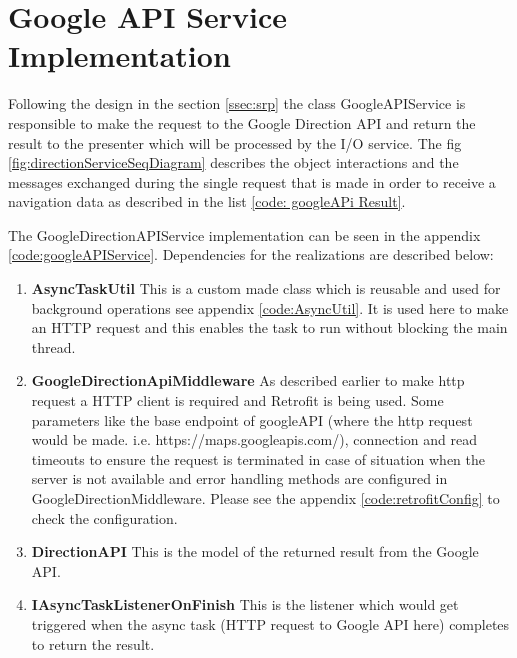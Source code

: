 \newpage
\section{Google API Service Implementation}
    Following the design in the section \ref{ssec:srp} the class 
    GoogleAPIService is responsible to make the request to the Google
    Direction API and return the result to the presenter which will be
    processed by the I/O service. The fig \ref{fig:directionServiceSeqDiagram}
    describes the object interactions and the messages exchanged during the
    single request that is made in order to receive a navigation data as described in
    the list \ref{code: googleAPi Result}.
    
    \par
        The GoogleDirectionAPIService implementation can be seen in
        the appendix \ref{code:googleAPIService}.
        Dependencies for the realizations are described below:
        \begin{enumerate}
            \item  
                \textbf{AsyncTaskUtil}
                    This is a custom made class which is reusable and used for background
                    operations see appendix \ref{code:AsyncUtil}. It is used here to make an HTTP request and this enables
                    the task to run without blocking the main thread. 
            \item  
                \textbf{GoogleDirectionApiMiddleware}
                As described earlier to make http request a HTTP client 
                is required and Retrofit
                is being used. Some parameters like the base endpoint of googleAPI 
                (where the http
                request would be made. i.e. https://maps.googleapis.com/), 
                connection and read timeouts
                to ensure the request is terminated 
                in case of situation when the server is not available 
                and error handling methods are configured in 
                GoogleDirectionMiddleware. Please see the appendix 
                \ref{code:retrofitConfig} to check the configuration. 
            \item  
                \textbf{DirectionAPI}
                    This is the model of the returned result from the Google
                    API.
            \item  
                \textbf{IAsyncTaskListenerOnFinish}
                    This is the listener which would get triggered when the
                    async task (HTTP request to Google API here) completes to
                    return the result.
        \end{enumerate}       
        



